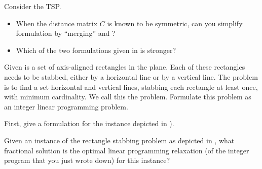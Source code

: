 \begin{exercise}
Consider the TSP.
\begin{itemize}
 \item When the distance matrix $C$ is known to be symmetric, can you simplify formulation  by ``merging''  and ?
 \item Which of the two formulations given in  is stronger?
\end{itemize}
\end{exercise}
\begin{exercise}
Given is a set of axis-aligned rectangles in the plane. Each of these rectangles needs to be stabbed, either by a horizontal line or by a vertical line. The problem is to find a set horizontal and vertical lines, stabbing each rectangle at least once, with minimum cardinality. We call this the  problem. Formulate this problem as an integer linear programming problem.
\begin{hint}
First, give a formulation for the instance depicted in ).
\end{hint}
\end{exercise}
\begin{exercise}
Given an instance of the rectangle stabbing problem as depicted in , what fractional solution is the optimal linear programming relaxation (of the integer program that you just wrote down) for this instance?
\end{exercise}

